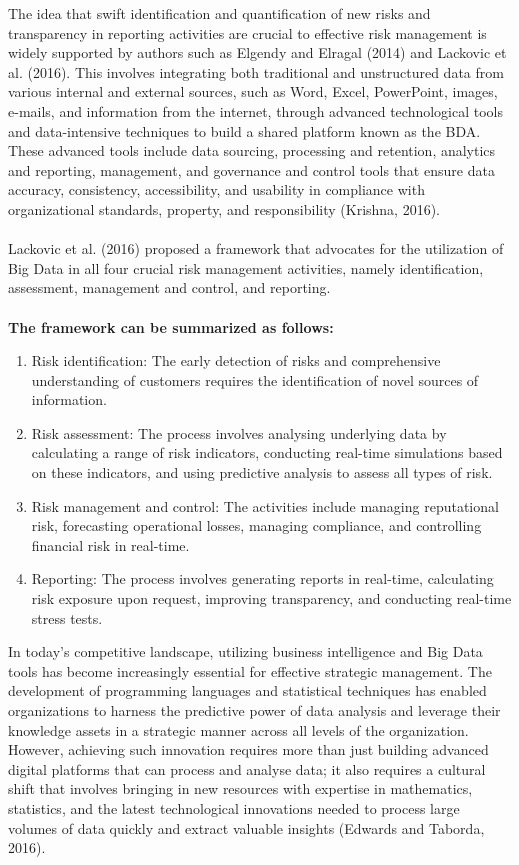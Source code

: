 The idea that swift identification and quantification of new risks and transparency in reporting activities are
crucial to effective risk management is widely supported by authors such as Elgendy and Elragal (2014) and
Lackovic et al. (2016). This involves integrating both traditional and unstructured data from various internal and
external sources, such as Word, Excel, PowerPoint, images, e-mails, and information from the internet, through
advanced technological tools and data-intensive techniques to build a shared platform known as the BDA. These
advanced tools include data sourcing, processing and retention, analytics and reporting, management, and
governance and control tools that ensure data accuracy, consistency, accessibility, and usability in compliance
with organizational standards, property, and responsibility (Krishna, 2016).\\\\
Lackovic et al. (2016) proposed a framework that advocates for the utilization of Big Data in all four crucial
risk management activities, namely identification, assessment, management and control, and reporting.\\\\
\textbf{The framework can be summarized as follows:}

\begin{enumerate}
    \item Risk identification: The early detection of risks and comprehensive understanding of customers requires
     the identification of novel sources of information.
    \item Risk assessment: The process involves analysing underlying data by calculating a range of risk indicators,
     conducting real-time simulations based on these indicators, and using predictive analysis to assess all types
      of risk.
    \item Risk management and control: The activities include managing reputational risk, forecasting operational
     losses, managing compliance, and controlling financial risk in real-time.
    \item Reporting: The process involves generating reports in real-time, calculating risk exposure upon request,
     improving transparency, and conducting real-time stress tests.\\
\end{enumerate}
In today's competitive landscape, utilizing business intelligence and Big Data tools has become increasingly
essential for effective strategic management. The development of programming languages and statistical techniques
has enabled organizations to harness the predictive power of data analysis and leverage their knowledge assets
in a strategic manner across all levels of the organization. However, achieving such innovation requires more
than just building advanced digital platforms that can process and analyse data; it also requires a cultural
shift that involves bringing in new resources with expertise in mathematics, statistics, and the latest
technological innovations needed to process large volumes of data quickly and extract valuable insights
(Edwards and Taborda, 2016).

